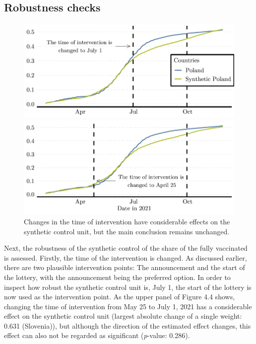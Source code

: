 \documentclass{scrbook}
\begin{document}
\subsection*{Robustness checks}

\begin{figure}[h]
\caption[Robustness check: Time of intervention]{Changes in the time of intervention have considerable effects on the synthetic control unit, but the main conclusion remains unchanged.}

\begin{center}\includegraphics{bachelor_thesis_files/figure-latex/unnamed-chunk-5-1} \end{center}



\begin{center}\includegraphics{bachelor_thesis_files/figure-latex/unnamed-chunk-5-2} \end{center}
\end{figure}

Next, the robustness of the synthetic control of the share of the fully
vaccinated is assessed. Firstly, the time of the intervention is
changed. As discussed earlier, there are two plausible intervention
points: The announcement and the start of the lottery, with the
announcement being the preferred option. In order to inspect how robust
the synthetic control unit is, July 1, the start of the lottery is now
used as the intervention point. As the upper panel of Figure 4.4 shows,
changing the time of intervention from May 25 to July 1, 2021 has a
considerable effect on the synthetic control unit (largest absolute
change of a single weight: 0.631 (Slovenia)), but although the direction
of the estimated effect changes, this effect can also not be regarded as
significant (\textit{p}-value: 0.286).
\end{document}
